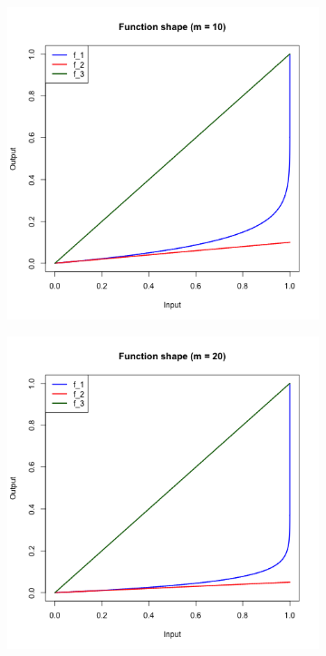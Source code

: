 \documentclass[a4paper, 11pt]{article}
\begin{document}
\begin{figure}[H]
\centering
\begin{subfigure}{.5\textwidth}
  \centering
  \includegraphics[width=1\linewidth]{pic4.png}
\end{subfigure}%
\begin{subfigure}{.5\textwidth}
  \centering
  \includegraphics[width=1\linewidth]{pic5.png}
\end{subfigure}
\end{figure}
\end{document}
